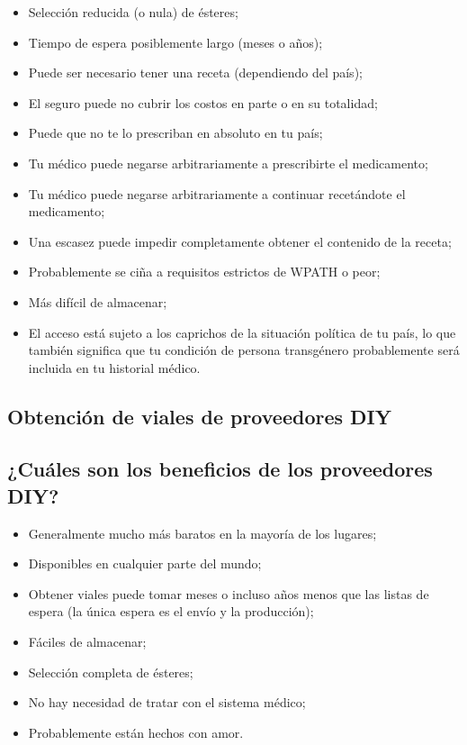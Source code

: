 \documentclass{article}
\begin{document}
\begin{itemize}
  \item Selección reducida (o nula) de ésteres;
  \item Tiempo de espera posiblemente largo (meses o años);
  \item Puede ser necesario tener una receta (dependiendo del país);
  \item El seguro puede no cubrir los costos en parte o en su totalidad;
  \item Puede que no te lo prescriban en absoluto en tu país;
  \item Tu médico puede negarse arbitrariamente a prescribirte el medicamento;
  \item Tu médico puede negarse arbitrariamente a continuar recetándote el medicamento;
  \item Una escasez puede impedir completamente obtener el contenido de la receta;
  \item Probablemente se ciña a requisitos estrictos de WPATH o peor;
  \item Más difícil de almacenar;
  \item El acceso está sujeto a los caprichos de la situación política de tu país, lo que también significa que tu condición de persona transgénero probablemente será incluida en tu historial médico.
\end{itemize}

\subsection*{Obtención de viales de proveedores DIY}

\subsection{¿Cuáles son los beneficios de los proveedores DIY?}

\begin{itemize}
\item Generalmente mucho más baratos en la mayoría de los lugares;
\item Disponibles en cualquier parte del mundo;
\item Obtener viales puede tomar meses o incluso años menos que las listas de espera (la única espera es el envío y la producción);
\item Fáciles de almacenar;
\item Selección completa de ésteres;
\item No hay necesidad de tratar con el sistema médico;
\item Probablemente están hechos con amor.
\end{itemize}
\end{document}
